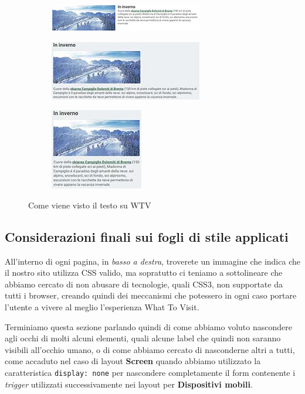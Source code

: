 \begin{figure}[h!]
        \centering
        \begin{subfigure}[b]{0.3\textwidth}
                \includegraphics[scale=0.7]{images/pres_descr.jpg}
                \label{fig:Descr-screen}
        \end{subfigure}
        \hspace{5cm}
        \begin{subfigure}[b]{0.3\textwidth}
                \includegraphics[scale=0.7]{images/pres_descr_t.jpg}
                \label{fig:Descr-tablet}
        \end{subfigure}
        \begin{subfigure}[b]{0.3\textwidth}
                \centering
                \includegraphics[scale=0.7]{images/pres_descr_m.jpg}
                \label{fig:Descr-mobile}
        \end{subfigure}
        \caption{Come viene visto il testo su WTV}\label{fig:Display-Descrloc}
\end{figure}

\subsection{Considerazioni finali sui fogli di stile applicati}\label{sec:Pres-CSSValid}
All'interno di ogni pagina, in \textit{basso a destra}, troverete un immagine
che indica che il nostro sito utilizza CSS valido, ma sopratutto ci teniamo a
sottolineare che abbiamo cercato di non abusare di tecnologie, quali CSS3, non
supportate da tutti i browser, creando quindi dei meccanismi che potessero in
ogni caso portare l'utente a vivere al meglio l'esperienza What To Visit.

Terminiamo questa sezione parlando quindi di come abbiamo voluto nascondere
agli occhi di molti alcuni elementi, quali alcune label che quindi non saranno
visibili all'occhio umano, o di come abbiamo cercato di nasconderne altri a
tutti, come accaduto nel caso di layout \textbf{Screen} quando abbiamo
utilizzato la caratteristica \texttt{display: none} per nascondere
completamente il form contenente i \textit{trigger} utilizzati successivamente
nei layout per \textbf{Dispositivi mobili}.
